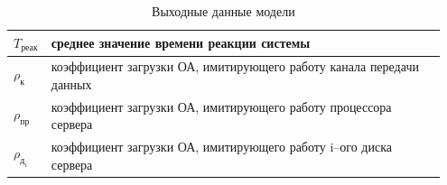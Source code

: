 \begin{table}[h]
\caption{Выходные данные модели}
\label{table:out_data}
\centering
 \begin{tabular}{|m{0.05\linewidth}|m{0.9\linewidth}|}
 \hline $T_{\text{реак}}$ & среднее значение времени реакции системы \\
 \hline $\rho_{\text{к}}$ & коэффициент загрузки ОА, имитирующего работу канала передачи данных \\
 \hline $\rho_{\text{пр}}$ & коэффициент загрузки ОА, имитирующего работу процессора сервера \\
 \hline $\rho_{\text{д}_i}$ & коэффициент загрузки ОА, имитирующего работу i–ого диска сервера \\
 \hline
 \end{tabular}
\end{table}